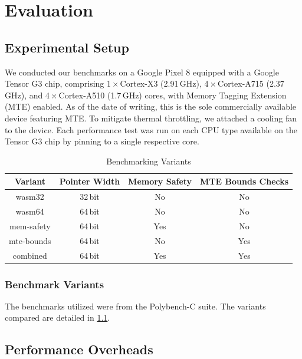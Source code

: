 \chapter{Evaluation}
\label{ch:eval}


\section{Experimental Setup}\label{sec:experimental-setup}

We conducted our benchmarks on a Google Pixel 8 equipped with a Google Tensor G3 chip, comprising 1\,$\times$\,Cortex-X3 (2.91\,GHz), 4\,$\times$\,Cortex-A715 (2.37\,GHz), and 4\,$\times$\,Cortex-A510 (1.7\,GHz) cores, with Memory Tagging Extension (MTE) enabled.
As of the date of writing, this is the sole commercially available device featuring MTE.
To mitigate thermal throttling, we attached a cooling fan to the device.
Each performance test was run on each CPU type available on the Tensor G3 chip by pinning to a single respective core.

\begin{table}[ht]
    \centering
    \small
    \begin{tabular}{c || c c c}
        \hline
        \textbf{Variant} & \textbf{Pointer Width} & \textbf{Memory Safety} & \textbf{MTE Bounds Checks} \\
        \hline
        wasm32     & 32\,bit & No  & No  \\
        wasm64     & 64\,bit & No  & No  \\
        mem-safety & 64\,bit & Yes & No  \\
        mte-bounds & 64\,bit & No  & Yes \\
        combined   & 64\,bit & Yes & Yes \\
        \hline
    \end{tabular}
    \caption{Benchmarking Variants}
    \label{tab:benchmark-variants}
\end{table}

\subsection{Benchmark Variants}\label{subsec:benchmark-variants}
The benchmarks utilized were from the Polybench-C suite.
The variants compared are detailed in \cref{tab:benchmark-variants}.

\section{Performance Overheads}
\label{sec:performance-overheads}

